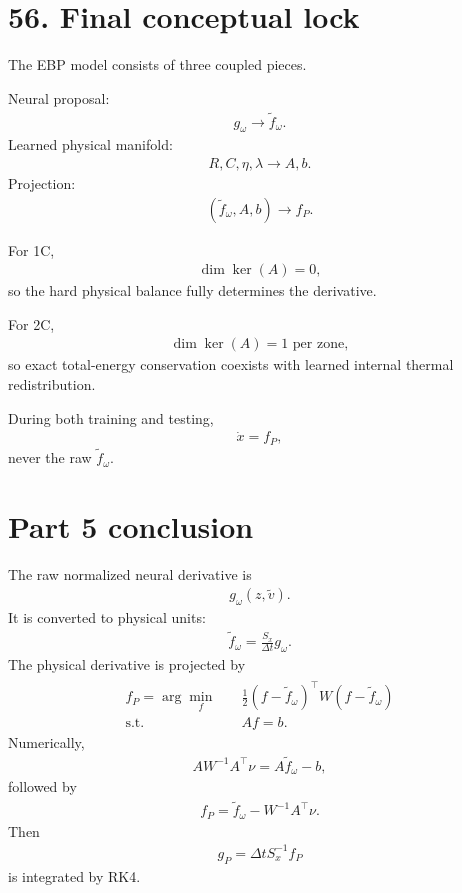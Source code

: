 \documentclass[11pt]{article}
\begin{document}
\section*{56. Final conceptual lock}

The EBP model consists of three coupled pieces.

Neural proposal:
\begin{align}
\boxed{g_\omega\rightarrow\widetilde f_\omega.}
\tag{E5.207}
\end{align}
Learned physical manifold:
\begin{align}
\boxed{R,C,\eta,\lambda\rightarrow A,b.}
\tag{E5.208}
\end{align}
Projection:
\begin{align}
\boxed{(\widetilde f_\omega,A,b)\rightarrow f_P.}
\tag{E5.209}
\end{align}

For 1C,
\begin{align}
\boxed{\dim\ker(A)=0,}
\tag{E5.210}
\end{align}
so the hard physical balance fully determines the derivative.

For 2C,
\begin{align}
\boxed{\dim\ker(A)=1\text{ per zone},}
\tag{E5.211}
\end{align}
so exact total-energy conservation coexists with learned internal thermal redistribution.

During both training and testing,
\begin{align}
\boxed{\dot x=f_P,}
\tag{E5.212}
\end{align}
never the raw \(\widetilde f_\omega\).

\section*{Part 5 conclusion}

The raw normalized neural derivative is
\begin{align}
\boxed{g_\omega(z,\widetilde v).}
\end{align}
It is converted to physical units:
\begin{align}
\boxed{\widetilde f_\omega=\frac{S_x}{\Delta t}g_\omega.}
\end{align}
The physical derivative is projected by
\begin{align}
\boxed{\begin{aligned}f_P=\arg\min_f\quad&\frac12(f-\widetilde f_\omega)^\top W(f-\widetilde f_\omega)\\\text{s.t.}\quad&Af=b.\end{aligned}}
\end{align}
Numerically,
\begin{align}
\boxed{AW^{-1}A^\top\nu=A\widetilde f_\omega-b,}
\end{align}
followed by
\begin{align}
\boxed{f_P=\widetilde f_\omega-W^{-1}A^\top\nu.}
\end{align}
Then
\begin{align}
\boxed{g_P=\Delta tS_x^{-1}f_P}
\end{align}
is integrated by RK4.
\end{document}
